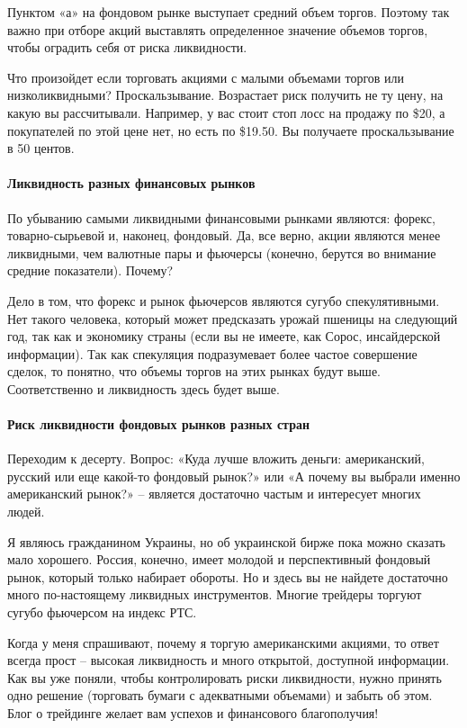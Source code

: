 \documentclass[a5paper]{article}
\begin{document}
Пунктом «а» на фондовом рынке выступает средний объем торгов. Поэтому так важно при отборе акций выставлять определенное значение объемов торгов, чтобы оградить себя от риска ликвидности.

Что произойдет если торговать акциями с малыми объемами торгов или
низколиквидными? Проскальзывание. Возрастает риск получить не ту цену,
на какую вы рассчитывали. Например, у вас стоит стоп лосс на продажу
по \$20, а покупателей по этой цене нет, но есть по \$19.50. Вы
получаете проскальзывание в 50 центов.

\paragraph{Ликвидность разных финансовых рынков}

По убыванию самыми ликвидными финансовыми рынками являются: форекс, товарно-сырьевой и, наконец, фондовый. Да, все верно, акции являются менее ликвидными, чем валютные пары и фьючерсы (конечно, берутся во внимание средние показатели). Почему?

Дело в том, что форекс и рынок фьючерсов являются сугубо
спекулятивными. Нет такого человека, который может предсказать урожай
пшеницы на следующий год, так как и экономику страны (если вы не
имеете, как Сорос, инсайдерской информации). Так как спекуляция
подразумевает более частое совершение сделок, то понятно, что объемы
торгов на этих рынках будут выше. Соответственно и ликвидность здесь
будет выше.

\paragraph{Риск ликвидности фондовых рынков разных стран}

Переходим к десерту. Вопрос: «Куда лучше вложить деньги: американский, русский или еще какой-то фондовый рынок?» или «А почему вы выбрали именно американский рынок?» – является достаточно частым и интересует многих людей.

Я являюсь гражданином Украины, но об украинской бирже пока можно сказать мало хорошего. Россия, конечно, имеет молодой и перспективный фондовый рынок, который только набирает обороты. Но и здесь вы не найдете достаточно много по-настоящему ликвидных инструментов. Многие трейдеры торгуют сугубо фьючерсом на индекс РТС.

Когда у меня спрашивают, почему я торгую американскими акциями, то ответ всегда прост – высокая ликвидность и много открытой, доступной информации. Как вы уже поняли, чтобы контролировать риски ликвидности, нужно принять одно решение (торговать бумаги с адекватными объемами) и забыть об этом. Блог о трейдинге желает вам успехов и финансового благополучия!
\end{document}
